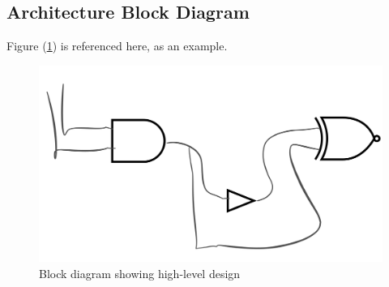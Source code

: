 \subsection{Architecture Block Diagram}
	Figure (\ref{fig:architecture.block_diagram}) is referenced here, as an example.

	\begin{figure}[H]
		\centering
		\includegraphics[width=0.8\linewidth]{images/architecture.block_diagram.png}
		\caption{Block diagram showing high-level design}
		\label{fig:architecture.block_diagram}
		\vspace{15px}
	\end{figure}
